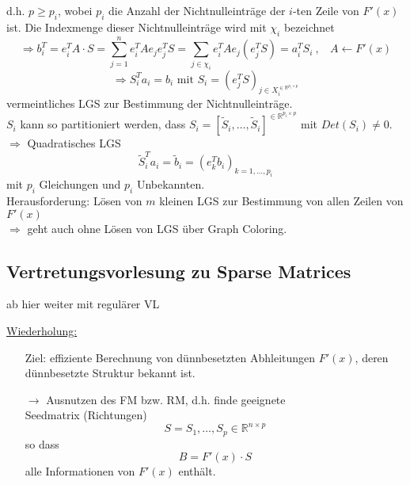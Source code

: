 \noindent
d.h. $p \geq p_i$, wobei $p_i$ die Anzahl der Nichtnulleinträge der $i$-ten Zeile von $F'(x)$ ist. Die Indexmenge dieser Nichtnulleinträge wird mit $\chi_i$ bezeichnet
$$\Rightarrow b_i^T = e_i^T A \cdot S = \sum_{j=1}^n e_i^T A e_j e_j^T S =\sum_{j\in \chi_i} e_i^T A e_j (e_j^T S) = a_i^T S_i \ ,\ \ \ \ A \leftarrow F'(x)$$
$$\Rightarrow S_i^Ta_i = b_i\text{ mit }S_i = (e_j^TS)_{j\in X_i^{\in \mathbb{R}^{p_i\times p}}}$$
vermeintliches LGS zur Bestimmung der Nichtnulleinträge.\\
$S_i$ kann so partitioniert werden, dass $S_i = [\tilde{S}_i,\dots,\tilde{S}_i]^{\in \mathbb{R}^{p_i\times p}}$ mit $Det(S_i) \neq 0$.\\
$\Rightarrow$ Quadratisches LGS
$$\tilde{S}_i^Ta_i = \tilde{b}_i=\left(e_k^Tb_i\right)_{k=1,\dots,p_i}$$
mit $p_i$ Gleichungen und $p_i$ Unbekannten.\\

\noindent
Herausforderung: Lösen von $m$ kleinen LGS zur Bestimmung von allen Zeilen von $F'(x)$\\

\noindent
$\Rightarrow$ geht auch ohne Lösen von LGS über Graph Coloring.

\noindent\makebox[\linewidth]{\rule{\paperwidth}{0.4pt}}
\subsection{Vertretungsvorlesung zu Sparse Matrices}
\label{subsec:vertretungsvorlesung}


\noindent\makebox[\linewidth]{\rule{\paperwidth}{0.4pt}}
ab hier weiter mit regulärer VL

\noindent\makebox[\linewidth]{\rule{\paperwidth}{0.4pt}}

\noindent
\underline{Wiederholung:}
\begin{itemize}
	\item[Ziel:] effiziente Berechnung von dünnbesetzten Abhleitungen $F'(x)$, deren dünnbesetzte Struktur bekannt ist.
	\item[$\rightarrow$]  Ausnutzen des FM bzw. RM, d.h. finde geeignete\\ Seedmatrix (Richtungen)
	$$S = S_1, \dots , S_p \in \mathbb{R}^{n\times p}$$
	so dass
	$$B=F'(x) \cdot S$$
	alle Informationen von $F'(x)$ enthält.
	
\end{itemize}

